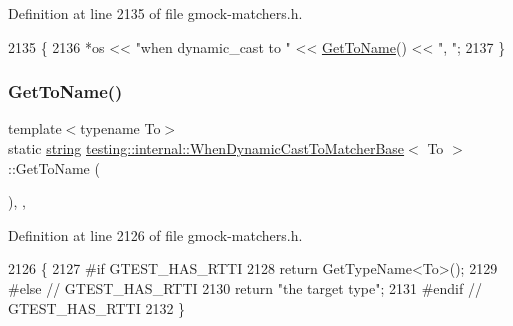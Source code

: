 Definition at line 2135 of file gmock-\/matchers.\+h.


\begin{DoxyCode}
2135                                                      \{
2136     *os << \textcolor{stringliteral}{"when dynamic\_cast to "} << \hyperlink{classtesting_1_1internal_1_1WhenDynamicCastToMatcherBase_a5950142a073ce7a1931848a958c88962}{GetToName}() << \textcolor{stringliteral}{", "};
2137   \}
\end{DoxyCode}
\mbox{\label{classtesting_1_1internal_1_1WhenDynamicCastToMatcherBase_a5950142a073ce7a1931848a958c88962}} 
\subsubsection{\texorpdfstring{Get\+To\+Name()}{GetToName()}}
{\footnotesize\ttfamily template$<$typename To$>$ \\
static \hyperlink{namespacetesting_1_1internal_a8e8ff5b11e64078831112677156cb111}{string} \hyperlink{classtesting_1_1internal_1_1WhenDynamicCastToMatcherBase}{testing\+::internal\+::\+When\+Dynamic\+Cast\+To\+Matcher\+Base}$<$ To $>$\+::Get\+To\+Name (\begin{DoxyParamCaption}{ }\end{DoxyParamCaption})\hspace{0.3cm}{\ttfamily [inline]}, {\ttfamily [static]}, {\ttfamily [protected]}}



Definition at line 2126 of file gmock-\/matchers.\+h.


\begin{DoxyCode}
2126                             \{
2127 \textcolor{preprocessor}{#if GTEST\_HAS\_RTTI}
2128     \textcolor{keywordflow}{return} GetTypeName<To>();
2129 \textcolor{preprocessor}{#else  // GTEST\_HAS\_RTTI}
2130     \textcolor{keywordflow}{return} \textcolor{stringliteral}{"the target type"};
2131 \textcolor{preprocessor}{#endif  // GTEST\_HAS\_RTTI}
2132   \}
\end{DoxyCode}
\mbox{\label{classtesting_1_1internal_1_1WhenDynamicCastToMatcherBase_a49ba9167d6bb9e70abda113217018627}} 
